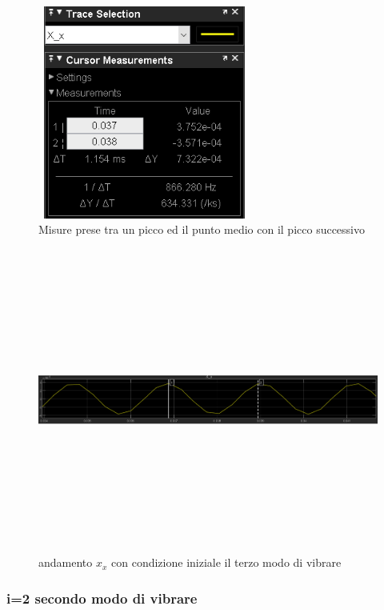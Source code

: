 \documentclass{article}
\begin{document}
\begin{enumerate}
\begin{figure}[H]
\centering
\includegraphics[width=7cm,height=7cm,keepaspectratio]{./simulink/assex/modo3_xtab.png}
\caption{Misure prese tra un picco ed il punto medio con il picco successivo}
\end{figure}

\begin{figure}[H]
\centering
\includegraphics[width=12cm,height=10cm,keepaspectratio]{./simulink/assex/modo3_x.png}
\caption{andamento $x_{x}$ con condizione iniziale il terzo modo di vibrare}
\end{figure}
\end{enumerate}

\subsubsection{i=2 secondo modo di vibrare}
\end{document}
